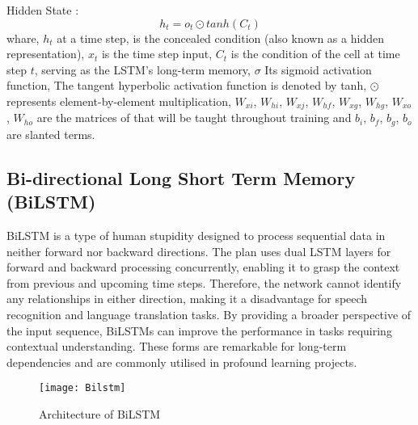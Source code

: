  Hidden State :
  \begin{equation} \label{lstm h}
      h_t=o_t \odot tanh(C_t)
  \end{equation}
whare,  $h_t$ at a time step,  is the concealed condition (also known as a hidden representation),  $x_t$  is the time step input,  $C_t$  is the condition of the cell at time step $t$,  serving as the LSTM's long-term memory,  $\sigma$ Its sigmoid activation function,  The tangent hyperbolic activation function is denoted by tanh,  $\odot$ represents element-by-element multiplication,  $W_{xi}$,  $W_{hi}$,  $W_{xj}$,  $W_{hf}$,  $W_{xg}$,  $W_{hg}$,  $W_{xo}$,  $W_{ho}$ are the matrices of that will be taught throughout training and $b_i$,  $b_f$,  $b_g$,  $b_o$ are slanted terms.


\subsection{Bi-directional Long Short Term Memory (BiLSTM)}
BiLSTM is a type of human stupidity designed to process sequential data in neither forward nor backward directions. The plan uses dual LSTM layers for forward and backward processing concurrently,  enabling it to grasp the context from previous and upcoming time steps. Therefore,  the network cannot identify any relationships in either direction,  making it a disadvantage for speech recognition and language translation tasks. By providing a broader perspective of the input sequence,  BiLSTMs can improve the performance in tasks requiring contextual understanding. These forms are remarkable for long-term dependencies and are commonly utilised in profound learning projects.

\begin{figure*}[h!]
  \centering
  \texttt{[image: Bilstm]}
  \caption{Architecture of BiLSTM \cite{article}} \label{Bilstm}
\end{figure*}



